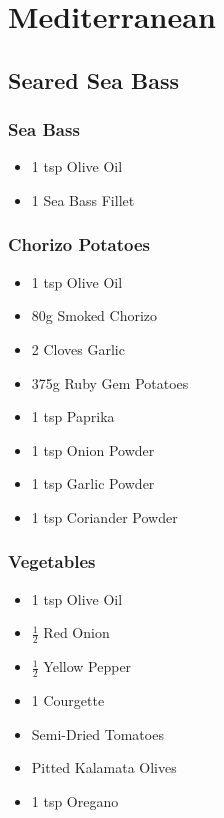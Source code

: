 \documentclass[11pt, english]{article}
\begin{document}
\newpage

\section{Mediterranean}

	\subsection{Seared Sea Bass}

		\subsubsection*{Sea Bass}

	\begin{itemize}
        \setlength\itemsep{0cm}
                \item 1 tsp Olive Oil
		\item 1 Sea Bass Fillet
        \end{itemize}

		\subsubsection*{Chorizo Potatoes}

	\begin{itemize}
        \setlength\itemsep{0cm}
                \item 1 tsp Olive Oil
		\item 80g Smoked Chorizo
		\item 2 Cloves Garlic
		\item 375g Ruby Gem Potatoes
		\item 1 tsp Paprika
		\item 1 tsp Onion Powder 
		\item 1 tsp Garlic Powder
		\item 1 tsp Coriander Powder
        \end{itemize}

		\subsubsection*{Vegetables}

	\begin{itemize}
        \setlength\itemsep{0cm}
                \item 1 tsp Olive Oil
		\item $\frac{1}{2}$ Red Onion
		\item $\frac{1}{2}$ Yellow Pepper
		\item 1 Courgette
		\item Semi-Dried Tomatoes
		\item Pitted Kalamata Olives
		\item 1 tsp Oregano
        \end{itemize}
\end{document}

